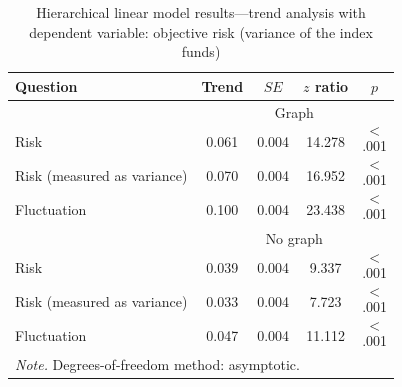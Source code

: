 \documentclass[a4paper,man, natbib,floatsintext]{apa6} %
\begin{document}
{%
\begin{table}[ht!]
\centering
\caption{Hierarchical linear model results---trend analysis with dependent variable: objective risk (variance of the index funds)} 
\label{tab:study2_hlm_trends}
\begin{tabular}{lcccc}
  \toprule
Question & Trend & $SE$ & $z$ ratio & $p$ \\ 
  \midrule
& \multicolumn{4}{c}{Graph}\\
\cmidrule{2-5}
  Risk & 0.061 & 0.004 & 14.278 & $$<$$.001 \\ 
  Risk (measured as variance) & 0.070 & 0.004 & 16.952 & $$<$$.001 \\
   Fluctuation & 0.100 & 0.004 & 23.438 & $$<$$.001 \\ 
   \midrule
& \multicolumn{4}{c}{No graph}\\
\cmidrule{2-5} 
  Risk & 0.039 & 0.004  & 9.337 & $$<$$.001 \\ 
    Risk (measured as variance) & 0.033 & 0.004  & 7.723 & $$<$$.001 \\ 
  Fluctuation & 0.047 & 0.004  & 11.112 & $$<$$.001 \\ 
   \bottomrule
\multicolumn{5}{l}{\rule{0em}{2.5ex}{\footnotesize \textit{Note. }Degrees-of-freedom method: asymptotic}.}\\
\end{tabular}
\end{table}
%

}
\end{document}
